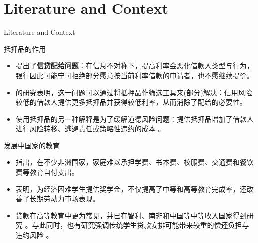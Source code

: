 \section{Literature and Context}


\begin{frame}[allowframebreaks]{Literature and Context}
  \begin{block}{抵押品的作用}
    \begin{itemize}
      \item \textcite{stiglitz1981credit} 提出了\textbf{信贷配给问题}：在信息不对称下，提高利率会恶化借款人类型与行为，银行因此可能宁可拒绝部分愿意按当前利率借款的申请者，也不愿继续提价。
      \item \textcite{bester1985screening} 的研究表明，这一问题可以通过将抵押品作筛选工具来(部分)解决：信用风险较低的借款人提供更多抵押品并获得较低利率，从而消除了配给的必要性。
      \item 使用抵押品的另一种解释是为了缓解道德风险问题：提供抵押品增加了借款人进行风险转移、逃避责任或策略性违约的成本 \parencite{bester1987role,chan1987collateral,tirole2006theory}。
    \end{itemize}
  \end{block}


  \medskip
  \begin{block}{发展中国家的教育}

    \begin{itemize}
      \item \textcite{williams2015education} 指出，在不少非洲国家，家庭难以承担学费、书本费、校服费、交通费和餐饮费等教育自付支出。
      \item \textcite{duflo2021impact} 表明，为经济困难学生提供奖学金，不仅提高了中等和高等教育完成率，还改善了长期劳动力市场表现。
      \item 贷款在高等教育中更为常见，并已在智利、南非和中国等中等收入国家得到研究 \parencite{bucarey2020labor,gurgand2023student,cai2019repayment}。与此同时，也有研究强调传统学生贷款安排可能带来较重的偿还负担与违约风险 \parencite{cai2019repayment,dearden2019evaluating}。
    \end{itemize}
    
  \end{block}
\end{frame}
